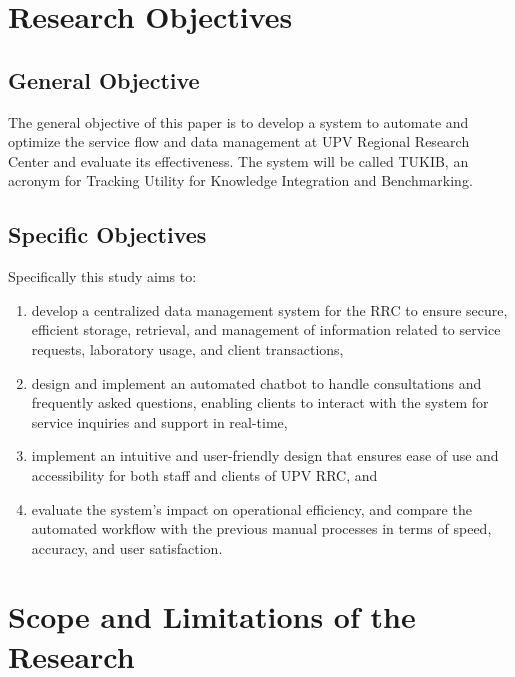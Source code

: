 \section{Research Objectives}
\label{sec:researchobjectives}

\subsection{General Objective}
\label{sec:generalobjective}

The general objective of this paper is to develop a system to automate and optimize the service flow and data management at UPV Regional Research Center and evaluate its effectiveness. The system will be called TUKIB, an acronym for Tracking Utility for Knowledge Integration and Benchmarking. 

\subsection{Specific Objectives}
\label{sec:specificobjectives}

Specifically this study aims to:

\begin{enumerate}
   
   \item develop a centralized data management system for the RRC to ensure secure, efficient storage, retrieval, and management of information related to service requests, laboratory usage, and client transactions,
   
   \item design and implement an automated chatbot to handle consultations and frequently asked questions, enabling clients to interact with the system for service inquiries and support in real-time,
   
   
   \item implement an intuitive and user-friendly design that ensures ease of use and accessibility for both staff and clients of UPV RRC, and
   
   \item evaluate the system’s impact on operational efficiency, and compare the automated workflow with the previous manual processes in terms of speed, accuracy, and user satisfaction.
   
\end{enumerate}


\section{Scope and Limitations of the Research}
\label{sec:scopelimitations}


